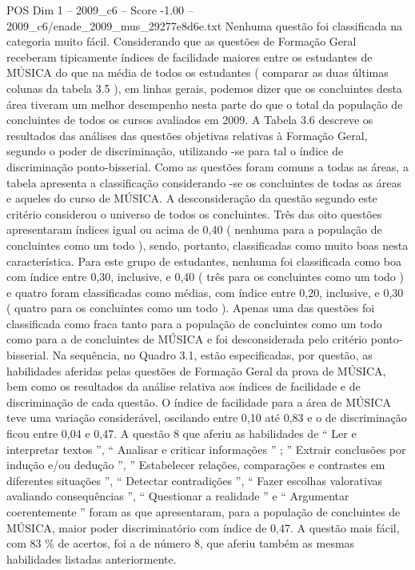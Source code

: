 \begin{textsample}{POS Dim 1 – 2009\_c6 – Score -1.00 – 2009\_c6/enade\_2009\_mus\_29277e8d6e.txt}
Nenhuma questão foi classificada na categoria muito fácil.
Considerando que as questões de Formação Geral receberam tipicamente índices de facilidade maiores entre os estudantes de MÚSICA do que na média de todos os estudantes ( comparar as duas últimas colunas da tabela 3.5 ), em linhas gerais, podemos dizer que os concluintes desta área tiveram um melhor desempenho nesta parte do que o total da população de concluintes de todos os cursos avaliados em 2009.
A Tabela 3.6 descreve os resultados das análises das questões objetivas relativas à Formação Geral, segundo o poder de discriminação, utilizando -se para tal o índice de discriminação ponto-bisserial.
Como as questões foram comuns a todas as áreas, a tabela apresenta a classificação considerando -se os concluintes de todas as áreas e aqueles do curso de MÚSICA.
A desconsideração da questão segundo este critério considerou o universo de todos os concluintes.
Três das oito questões apresentaram índices igual ou acima de 0,40 ( nenhuma para a população de concluintes como um todo ), sendo, portanto, classificadas como muito boas nesta característica.
Para este grupo de estudantes, nenhuma foi classificada como boa com índice entre 0,30, inclusive, e 0,40 ( três para os concluintes como um todo ) e quatro foram classificadas como médias, com índice entre 0,20, inclusive, e 0,30 ( quatro para os concluintes como um todo ).
Apenas uma das questões foi classificada como fraca tanto para a população de concluintes como um todo como para a de concluintes de MÚSICA e foi desconsiderada pelo critério ponto-bisserial.
Na sequência, no Quadro 3.1, estão especificadas, por questão, as habilidades aferidas pelas questões de Formação Geral da prova de MÚSICA, bem como os resultados da análise relativa aos índices de facilidade e de discriminação de cada questão.
O índice de facilidade para a área de MÚSICA teve uma variação considerável, oscilando entre 0,10 até 0,83 e o de discriminação ficou entre 0,04 e 0,47.
A questão 8 que aferiu as habilidades de “ Ler e interpretar textos ”, “ Analisar e criticar informações ” ; ” Extrair conclusões por indução e/ou dedução ”, ” Estabelecer relações, comparações e contrastes em diferentes situações ”, “ Detectar contradições ”, “ Fazer escolhas valorativas avaliando consequências ”, “ Questionar a realidade ” e “ Argumentar coerentemente ” foram as que apresentaram, para a população de concluintes de MÚSICA, maior poder discriminatório com índice de 0,47.
A questão mais fácil, com 83 \% de acertos, foi a de número 8, que aferiu também as mesmas habilidades listadas anteriormente.

\end{textsample}

